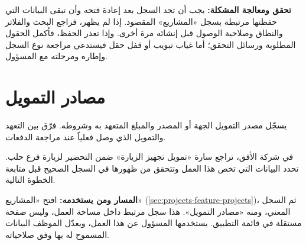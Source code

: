 \textbf{تحقق ومعالجة المشكلة:} يجب أن تجد السجل بعد إعادة فتحه وأن تبقى البيانات التي حفظتها مرتبطة بسجل «المشاريع» المقصود. إذا لم يظهر، فراجع البحث والفلاتر والنطاق وصلاحية الوصول قبل إنشائه مرة أخرى. وإذا تعذر الحفظ، فأكمل الحقول المطلوبة ورسائل التحقق؛ أما غياب تبويب أو قفل حقل فيستدعي مراجعة نوع السجل وإطاره ومرحلته مع المسؤول.

\clearpage
\section{مصادر التمويل}
\label{sec:projects-feature-funding-sources}

يسجّل مصدر التمويل الجهة أو المصدر والمبلغ المتعهد به وشروطه. فرّق بين التعهد والتمويل الذي وصل فعلياً عند مراجعة الدفعات.

\begin{rcnote}
في شركة الأفق، تراجع سارة «تمويل تجهيز الزيارة» ضمن التحضير لزيارة فرع حلب. تحدد البيانات التي تخص هذا العمل وتتحقق من ظهورها في السجل الصحيح قبل متابعة الخطوة التالية.
\end{rcnote}

\textbf{المسار ومن يستخدمه:} افتح «المشاريع» (\ref{sec:projects-feature-projects})، ثم السجل المعني، ومنه «مصادر التمويل». هذا سجل مرتبط داخل مساحة العمل، وليس صفحة مستقلة في قائمة التطبيق. يستخدمها المسؤول عن هذا العمل، ويعدّل الموظف البيانات المسموح له بها وفق صلاحياته.

